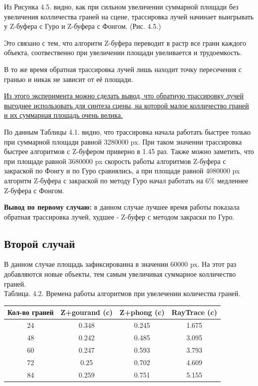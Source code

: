 \documentclass[12pt]{report}
\begin{document}
	Из Рисунка 4.5. видно, как при сильном увеличении суммарной площади без увеличения колличества граней на сцене, трассировка лучей начинает выигрывать у Z-буфера с Гуро и Z-буфера с Фонгом. (Рис. 4.5.)
	
	Это связано с тем, что алгоритм Z-буфера переводит в растр все грани каждого объекта, соотвественно при увеличении площади увеливается и трудоемкость.
	
	В то же время обратная трассировка лучей лишь находит точку пересечения с гранью и никак не зависит от её площади.
	
	\uline{Из этого эксперимента можно сделать вывод, что обратную трассировку лучей выгоднее использовать для синтеза сцены, на которой малое колличество граней и их суммарная площадь очень велика.}

	
	По данным Таблицы 4.1. видно, что трассировка начала работать быстрее только при суммарной площади равной 3280000 px. При таком значении трассировка быстрее алгоритмов с Z-буфером приверно в 1.45 раз.
	Также можно заметить, что при площаде равной 3680000 px скорость работы алгоритмов Z-буфера с закраской по Фонгу и по Гуро сравнялись, а при площаде равной 4080000 px алгоритм Z-буфера с закраской по методу Гуро начал работать на 6\% медленнее Z-буфера с Фонгом.
	
	\textbf{Вывод по первому случаю:} в данном случае лучшее время работы показала обратная трассировка лучей, худшее - Z-буфер с методом закраски по Гуро.
	
	\subsection{Второй случай}
	
	В данном случае площадь зафиксированна в значении 60000 px. На этот раз добавляются новые объекты, тем самым увеличивая суммарное колличество граней.
	~\\
	
		Таблица. 4.2. Времена работы алгоритмов при увелечении количества граней.
	
	\begin{center}
		\begin{tabular}{|c c c c|}
			\hline
			Кол-во граней & Z+gourand (c) & Z+phong (c) & RayTrace (c) \\ [0.5ex]
			\hline
			24 & 0.348 & 0.245 & 1.675 \\ 
			\hline 
			48 & 0.242 & 0.485 & 3.095 \\ 
			\hline 
			60 & 0.247 & 0.593 & 3.793 \\ 
			\hline 
			72 & 0.25 & 0.702 & 4.609 \\ 
			\hline 
			84 & 0.259 & 0.751 & 5.155 \\ 
			\hline
		\end{tabular}
	\end{center}
	~\\
\end{document}
